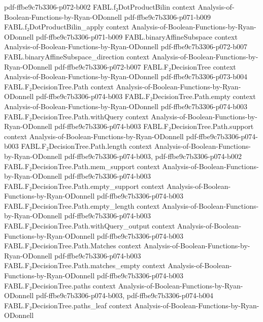 \begin{theorem}
  {pdf-ffbe9c7b3306-p072-b002}
\proofstep
  {FABL.f₂DotProductBilin}
  {context}
  {Analysis-of-Boolean-Functions-by-Ryan-ODonnell}
  {pdf-ffbe9c7b3306-p071-b009}
\proofstep
  {FABL.f₂DotProductBilin_apply}
  {context}
  {Analysis-of-Boolean-Functions-by-Ryan-ODonnell}
  {pdf-ffbe9c7b3306-p071-b009}
\proofstep
  {FABL.binaryAffineSubspace}
  {context}
  {Analysis-of-Boolean-Functions-by-Ryan-ODonnell}
  {pdf-ffbe9c7b3306-p072-b007}
\proofstep
  {FABL.binaryAffineSubspace_direction}
  {context}
  {Analysis-of-Boolean-Functions-by-Ryan-ODonnell}
  {pdf-ffbe9c7b3306-p072-b007}
\proofstep
  {FABL.F₂DecisionTree}
  {context}
  {Analysis-of-Boolean-Functions-by-Ryan-ODonnell}
  {pdf-ffbe9c7b3306-p073-b004}
\proofstep
  {FABL.F₂DecisionTree.Path}
  {context}
  {Analysis-of-Boolean-Functions-by-Ryan-ODonnell}
  {pdf-ffbe9c7b3306-p074-b003}
\proofstep
  {FABL.F₂DecisionTree.Path.empty}
  {context}
  {Analysis-of-Boolean-Functions-by-Ryan-ODonnell}
  {pdf-ffbe9c7b3306-p074-b003}
\proofstep
  {FABL.F₂DecisionTree.Path.withQuery}
  {context}
  {Analysis-of-Boolean-Functions-by-Ryan-ODonnell}
  {pdf-ffbe9c7b3306-p074-b003}
\proofstep
  {FABL.F₂DecisionTree.Path.support}
  {context}
  {Analysis-of-Boolean-Functions-by-Ryan-ODonnell}
  {pdf-ffbe9c7b3306-p074-b003}
\proofstep
  {FABL.F₂DecisionTree.Path.length}
  {context}
  {Analysis-of-Boolean-Functions-by-Ryan-ODonnell}
  {pdf-ffbe9c7b3306-p074-b003,
    pdf-ffbe9c7b3306-p074-b002}
\proofstep
  {FABL.F₂DecisionTree.Path.mem_support}
  {context}
  {Analysis-of-Boolean-Functions-by-Ryan-ODonnell}
  {pdf-ffbe9c7b3306-p074-b003}
\proofstep
  {FABL.F₂DecisionTree.Path.empty_support}
  {context}
  {Analysis-of-Boolean-Functions-by-Ryan-ODonnell}
  {pdf-ffbe9c7b3306-p074-b003}
\proofstep
  {FABL.F₂DecisionTree.Path.empty_length}
  {context}
  {Analysis-of-Boolean-Functions-by-Ryan-ODonnell}
  {pdf-ffbe9c7b3306-p074-b003}
\proofstep
  {FABL.F₂DecisionTree.Path.withQuery_output}
  {context}
  {Analysis-of-Boolean-Functions-by-Ryan-ODonnell}
  {pdf-ffbe9c7b3306-p074-b003}
\proofstep
  {FABL.F₂DecisionTree.Path.Matches}
  {context}
  {Analysis-of-Boolean-Functions-by-Ryan-ODonnell}
  {pdf-ffbe9c7b3306-p074-b003}
\proofstep
  {FABL.F₂DecisionTree.Path.matches_empty}
  {context}
  {Analysis-of-Boolean-Functions-by-Ryan-ODonnell}
  {pdf-ffbe9c7b3306-p074-b003}
\proofstep
  {FABL.F₂DecisionTree.paths}
  {context}
  {Analysis-of-Boolean-Functions-by-Ryan-ODonnell}
  {pdf-ffbe9c7b3306-p074-b003,
    pdf-ffbe9c7b3306-p074-b004}
\proofstep
  {FABL.F₂DecisionTree.paths_leaf}
  {context}
  {Analysis-of-Boolean-Functions-by-Ryan-ODonnell}

\end{theorem}
